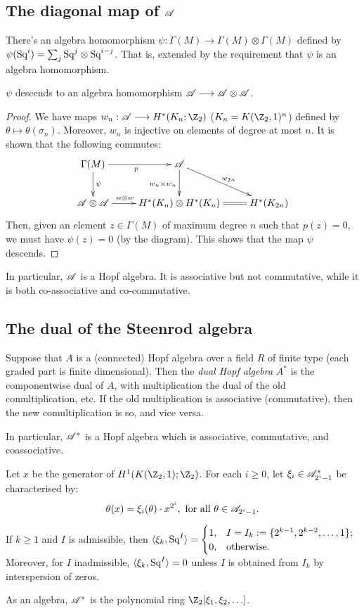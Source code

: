 \documentclass[11pt]{article}
\begin{document}
{\subsection{The diagonal map of \texorpdfstring{$\mathscr{A}$}{A}}
There's an algebra homomorphism $\psi:\Gamma(M)\to\Gamma(M)\otimes\Gamma(M)$ defined by $\psi(\textup{Sq}^i)=\sum_j \textup{Sq}^j\otimes\textup{Sq}^{i-j}$. That is, extended by the requirement that $\psi$ is an algebra homomorphism.
\begin{thm*}
$\psi$ descends to an algebra homomorphism $\mathscr{A}\longrightarrow\mathscr{A}\otimes\mathscr{A}$.
\end{thm*}
\begin{proof}
We have maps $w_n:\Steen\to H^*(K_n;\Z_2)$ ($K_n=K(\Z_2,1)^n$) defined by $\theta\mapsto\theta(\sigma_n)$. Moreover, $w_n$ is injective on elements of degree at most $n$. It is shown  that the following commutes:
\[\xymatrix{
\Gamma(M)\ar[r]_p\ar[d]^\psi&\Steen\ar[d]_{w_n\times w_n}\ar[rd]^{w_{2n}}\\
\Steen\otimes\Steen\ar[r]^{w\otimes w\qquad \ }&H^*(K_n)\otimes H^*(K_n)\ar@{=}[r]&H^*(K_{2n})
}\]
Then, given an element $z\in\Gamma(M)$ of maximum degree $n$ such that $p(z)=0$, we must have $\psi(z)=0$ (by the diagram). This shows that the map $\psi$ descends.%
\end{proof}
In particular, $\mathscr{A}$ is a Hopf algebra. It is associative but not commutative, while it is both co-associative and co-commutative.
\subsection{The dual of the Steenrod algebra}
Suppose that $A$ is a (connected) Hopf algebra over a field $R$ of finite type (each graded part is finite dimensional). Then the \emph{dual Hopf algebra} $A^*$ is the componentwise dual of $A$, with multiplication the dual of the old comultiplication, etc. If the old multiplication is associative (commutative), then the new comultiplication is so, and vice versa.

In particular, $\mathscr{A}^*$ is a Hopf algebra which is associative, commutative, and coassociative.

Let $x$ be the generator of $H^1(K(\Z_2,1);\Z_2)$. For each $i\geq0$, let $\xi_i\in\mathscr{A}^*_{2^i-1}$ be characterised by:
\[\theta(x)=\xi_i(\theta)\cdot x^{2^i},\text{ for all }\theta\in\mathscr{A}_{2^i-1}.\]
\begin{prop*}
If $k\geq1$ and $I$ is admissible, then $\langle\xi_k,\textup{Sq}^I\rangle=\begin{cases}1,&I=I_k:=\{2^{k-1},2^{k-2},\ldots,1\};\\0,&\textup{otherwise.}\end{cases}$ Moreover, for $I$ inadmissible, $\langle\xi_k,\textup{Sq}^I\rangle=0$ unless $I$ is obtained from $I_k$ by interspersion of zeros.
\end{prop*}
As an algebra, $\mathscr{A}^*$ is the polynomial ring $\Z_2[\xi_1,\xi_2,\ldots]$.

}
\end{document}
